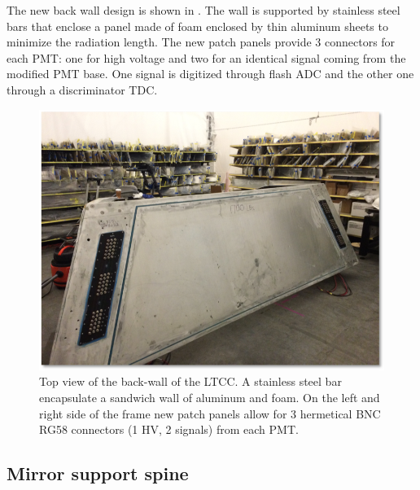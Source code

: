 The new back wall design is shown in . The wall is supported by stainless steel bars that enclose a panel made of foam enclosed by
thin aluminum sheets to minimize the radiation length.
The new patch panels provide 3 connectors for each PMT: one for high voltage and two for an identical signal coming from the modified PMT base.
One signal is digitized through flash ADC and the other one through a discriminator TDC.

\begin{figure}
	\centering
	\includegraphics[width=0.95\columnwidth,keepaspectratio]{img/backWall.png}
	\caption{Top view of the back-wall of the LTCC. A stainless steel bar encapsulate a sandwich wall of aluminum and foam. On the left and right side
            of the frame new patch panels allow for 3 hermetical BNC RG58 connectors (1 HV, 2 signals) from each PMT. }
	\label{fig:backWall}
\end{figure}


\subsection{Mirror support spine}

